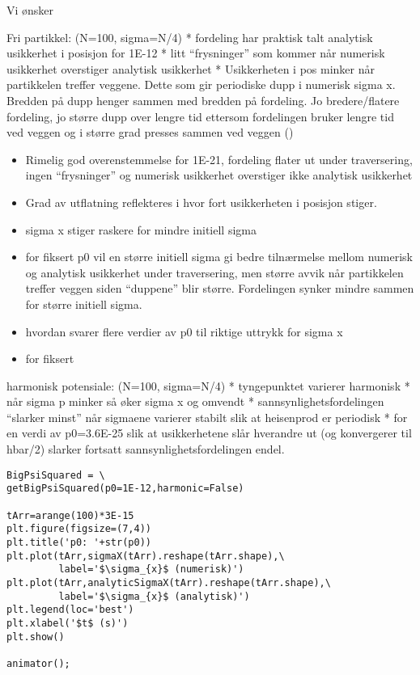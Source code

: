 \documentclass[11pt]{article}
\begin{document}
Vi ønsker

Fri partikkel: (N=100, sigma=N/4) * fordeling har praktisk talt
analytisk usikkerhet i posisjon for 1E-12 * litt ``frysninger'' som
kommer når numerisk usikkerhet overstiger analytisk usikkerhet *
Usikkerheten i pos minker når partikkelen treffer veggene. Dette som gir
periodiske dupp i numerisk sigma x. Bredden på dupp henger sammen med
bredden på fordeling. Jo bredere/flatere fordeling, jo større dupp over
lengre tid ettersom fordelingen bruker lengre tid ved veggen og i større
grad presses sammen ved veggen ()

\begin{itemize}
\item
  Rimelig god overenstemmelse for 1E-21, fordeling flater ut under
  traversering, ingen ``frysninger'' og numerisk usikkerhet overstiger
  ikke analytisk usikkerhet
\item
  Grad av utflatning reflekteres i hvor fort usikkerheten i posisjon
  stiger.
\item
  sigma x stiger raskere for mindre initiell sigma
\item
  for fiksert p0 vil en større initiell sigma gi bedre tilnærmelse
  mellom numerisk og analytisk usikkerhet under traversering, men større
  avvik når partikkelen treffer veggen siden ``duppene'' blir større.
  Fordelingen synker mindre sammen for større initiell sigma.
\item
  hvordan svarer flere verdier av p0 til riktige uttrykk for sigma x
\item
  for fiksert
\end{itemize}

harmonisk potensiale: (N=100, sigma=N/4) * tyngepunktet varierer
harmonisk * når sigma p minker så øker sigma x og omvendt *
sannsynlighetsfordelingen ``slarker minst'' når sigmaene varierer
stabilt slik at heisenprod er periodisk * for en verdi av p0=3.6E-25
slik at usikkerhetene slår hverandre ut (og konvergerer til hbar/2)
slarker fortsatt sannsynlighetsfordelingen endel.
%
\begin{lstlisting}
BigPsiSquared = \
getBigPsiSquared(p0=1E-12,harmonic=False)

tArr=arange(100)*3E-15
plt.figure(figsize=(7,4))
plt.title('p0: '+str(p0))
plt.plot(tArr,sigmaX(tArr).reshape(tArr.shape),\
         label='$\sigma_{x}$ (numerisk)')
plt.plot(tArr,analyticSigmaX(tArr).reshape(tArr.shape),\
         label='$\sigma_{x}$ (analytisk)')
plt.legend(loc='best')
plt.xlabel('$t$ (s)')
plt.show()

animator();
\end{lstlisting}%
    
\end{document}
